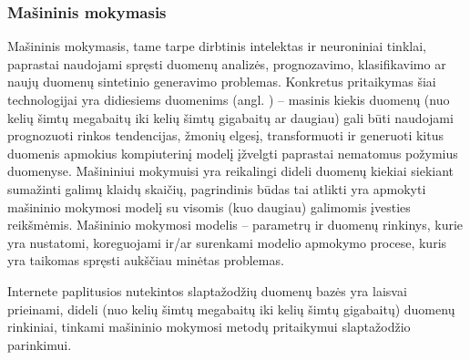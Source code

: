 \documentclass{VUMIFInfBakalaurinis}
\begin{document}
\subsubsection{Mašininis mokymasis}
Mašininis mokymasis, tame tarpe dirbtinis intelektas ir neuroniniai tinklai, 
paprastai naudojami spręsti duomenų analizės, prognozavimo, klasifikavimo ar 
naujų duomenų sintetinio generavimo problemas. Konkretus pritaikymas šiai 
technologijai yra didiesiems duomenims (angl. ) -- masinis 
kiekis duomenų (nuo kelių šimtų megabaitų iki kelių šimtų gigabaitų ar daugiau) 
gali būti naudojami prognozuoti rinkos tendencijas, žmonių elgesį, transformuoti 
ir generuoti kitus duomenis apmokius kompiuterinį modelį įžvelgti paprastai 
nematomus požymius duomenyse. Mašininiui mokymuisi yra reikalingi dideli duomenų 
kiekiai siekiant sumažinti galimų klaidų skaičių, pagrindinis būdas tai atlikti 
yra apmokyti mašininio mokymosi modelį su visomis (kuo daugiau) galimomis 
įvesties reikšmėmis. Mašininio mokymosi modelis -- parametrų ir duomenų 
rinkinys, kurie yra nustatomi, koreguojami ir/ar surenkami modelio apmokymo 
procese, kuris yra taikomas spręsti aukščiau minėtas problemas.

Internete paplitusios nutekintos slaptažodžių duomenų bazės yra laisvai 
prieinami, dideli (nuo kelių šimtų megabaitų iki kelių šimtų gigabaitų) duomenų 
rinkiniai, tinkami mašininio mokymosi metodų pritaikymui slaptažodžio 
parinkimui.
\end{document}
